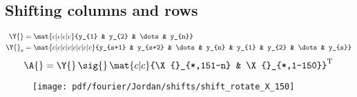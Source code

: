 \subsection{Shifting columns and rows}
\begin{equation}
  \begin{split}
    \Y{} & = \mat{c|c|c|c}{y_{1} & y_{2} & \dots & y_{n}}\\
    \Y{}_{s} & = \mat{c|c|c|c|c|c|c|c}{y_{s+1} & y_{s+2} & \dots & y_{n} & y_{1} & y_{2} & \dots & y_{s}}\\    
  \end{split}
\end{equation}
\begin{equation}
  \A{} = \Y{}\,\sig{}\,\mat{c|c}{\X{}_{*,151-n} & \X{}_{*,1-150}}^{\mathrm{T}}
\end{equation}

\begin{figure}[htbp] %
   \centering
   \texttt{[image: pdf/fourier/Jordan/shifts/shift\_rotate\_X\_150]} 
   \caption{}
   \label{fig:example}
\end{figure}
\clearpage


